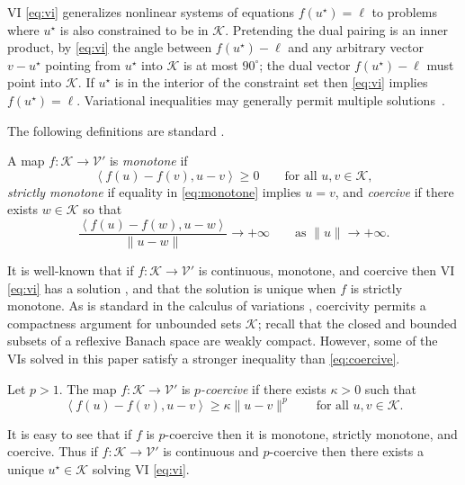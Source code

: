 \documentclass[review,hidelinks,onefignum,onetabnum]{siamart220329}
\newcommand{\cK}{\mathcal{K}}
\newcommand{\cV}{\mathcal{V}}
\newcommand{\ip}[2]{\left<#1,#2\right>}
\begin{document}
VI \eqref{eq:vi} generalizes nonlinear systems of equations $f(u^\star)=\ell$ to problems where $u^\star$ is also constrained to be in $\cK$.  Pretending the dual pairing is an inner product, by \eqref{eq:vi} the angle between $f(u^\star)-\ell$ and any arbitrary vector $v-u^\star$ pointing from $u^\star$ into $\cK$ is at most $90^\circ$; the dual vector $f(u^\star)-\ell$ must point into $\cK$.  If $u^\star$ is in the interior of the constraint set then \eqref{eq:vi} implies $f(u^\star)=\ell$.
Variational inequalities may generally permit multiple solutions~\cite{Farrell2019}.

The following definitions are standard \cite{KinderlehrerStampacchia1980}.

\begin{definition}  A map $f:\cK \to \cV'$ is \emph{monotone} if
\begin{equation}
\ip{f(u)-f(v)}{u-v} \ge 0 \qquad \text{for all } u,v \in \cK, \label{eq:monotone}
\end{equation}
\emph{strictly monotone} if equality in \eqref{eq:monotone} implies $u=v$, and \emph{coercive} if there exists $w \in \cK$ so that
\begin{equation}
\frac{\ip{f(u)-f(w)}{u-w}}{\|u-w\|} \to +\infty \qquad \text{as } \|u\|\to +\infty. \label{eq:coercive}
\end{equation}
\end{definition}

It is well-known that if $f:\cK \to \cV'$ is continuous, monotone, and coercive then VI \eqref{eq:vi} has a solution \cite[Corollary III.1.8]{KinderlehrerStampacchia1980}, and that the solution is unique when $f$ is strictly monotone.  As is standard in the calculus of variations \cite{Evans2010}, coercivity permits a compactness argument for unbounded sets $\cK$; recall that the closed and bounded subsets of a reflexive Banach space are weakly compact.  However, some of the VIs solved in this paper satisfy a stronger inequality than \eqref{eq:coercive}.

\begin{definition}  Let $p>1$.  The map $f:\cK \to \cV'$ is \emph{$p$-coercive} if there exists $\kappa>0$ such that
\begin{equation}
\ip{f(u)-f(v)}{u-v} \ge \kappa \|u-v\|^p \qquad \text{for all } u,v \in \cK. \label{eq:pcoercive}
\end{equation}
\end{definition}

It is easy to see that if $f$ is $p$-coercive then it is monotone, strictly monotone, and coercive.  Thus if $f:\cK \to \cV'$ is continuous and $p$-coercive then there exists a unique $u^\star\in \cK$ solving VI \eqref{eq:vi}.
\end{document}
